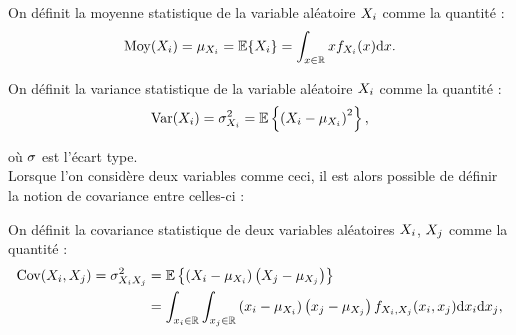 \begin{definition}
\label{def:context-definition-moyenne}
  On définit la moyenne statistique de la variable aléatoire
  $X_i$ comme la quantité :
\begin{equation}
  \operatorname{\operatorname{Moy}}(X_i)
  =
  \mu_{X_i}
  =
  \operatorname{\mathbb{E}}\{X_i\}
  =
  \int_{x\in\mathbb{R}}
  xf_{X_i}(x)\mathrm{d} x.
  \label{eq:context-definition-moyenne}
\end{equation}
\end{definition}


\begin{definition}
\label{def:context-definition-variance}
  On définit la variance statistique de la variable aléatoire
  $X_i$ comme la quantité :
\begin{equation}
  \operatorname{\operatorname{Var}}(X_i)
  =
  \sigma^2_{X_i}
  =
  \operatorname{\mathbb{E}}\left\{
    \left(X_i-\mu_{X_i}\right)^2
  \right\},
  \label{eq:context-definition-variance}
\end{equation}
\end{definition}

où $\sigma$ est l'écart type. \\


Lorsque l'on considère deux variables comme ceci, il est alors possible
de définir la notion de covariance entre celles-ci :

\begin{definition}[{Covariance}]
\label{def:context-definition-covariance}
  On définit la covariance statistique de deux variables aléatoires
  $X_i$, $X_j$ comme la quantité :
\begin{equation}
  \begin{aligned}
    \operatorname{\operatorname{Cov}}(X_i,X_j)
    =
    \sigma^2_{X_iX_j}
    &=
    \operatorname{\mathbb{E}}\left\{
      \left(X_i-\mu_{X_i}\right)
      \left(X_j-\mu_{X_j}\right)
    \right\}
    \\
    &=
    \int_{x_i\in\mathbb{R}}
    \int_{x_j\in\mathbb{R}}
    \left(x_i-\mu_{X_i}\right)
    \left(x_j-\mu_{X_j}\right)
    f_{X_i,X_j}
    (x_i,x_j)
    \mathrm{d} x_i\mathrm{d} x_j,
  \end{aligned}
  \label{eq:context-definition-covariance-formula}
\end{equation}
\end{definition}

